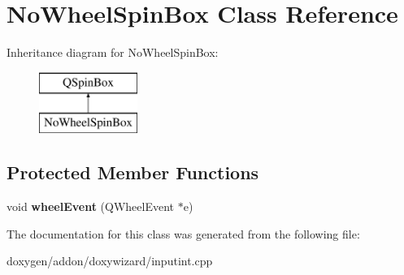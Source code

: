 \hypertarget{class_no_wheel_spin_box}{}\section{No\+Wheel\+Spin\+Box Class Reference}
\label{class_no_wheel_spin_box}
Inheritance diagram for No\+Wheel\+Spin\+Box\+:\begin{figure}[H]
\begin{center}
\leavevmode
\includegraphics[height=2.000000cm]{class_no_wheel_spin_box}
\end{center}
\end{figure}
\subsection*{Protected Member Functions}
\begin{DoxyCompactItemize}
\item 
\mbox{\label{class_no_wheel_spin_box_aadbd4f1210c8ebe52955913ad8f2239d}} 
void {\bfseries wheel\+Event} (Q\+Wheel\+Event $\ast$e)
\end{DoxyCompactItemize}


The documentation for this class was generated from the following file\+:\begin{DoxyCompactItemize}
\item 
doxygen/addon/doxywizard/inputint.\+cpp\end{DoxyCompactItemize}
